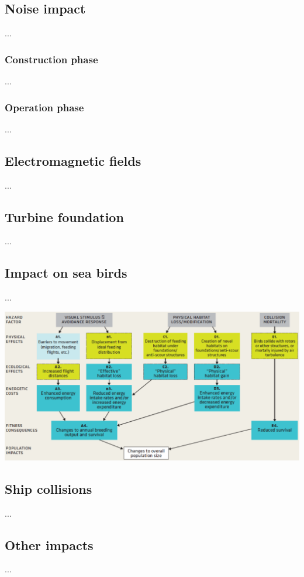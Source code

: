 \documentclass{article}
\begin{document}
\subsection{Noise impact}
...

\subsubsection{Construction phase}
...

\subsubsection{Operation phase}
...

\subsection{Electromagnetic fields}
...

\subsection{Turbine foundation}
...

\subsection{Impact on sea birds}
...

\begin{center}
    \includegraphics[width=\textwidth]{media/offshore_impact.png}
\end{center}

\subsection{Ship collisions}
...

\subsection{Other impacts}
...
\end{document}
